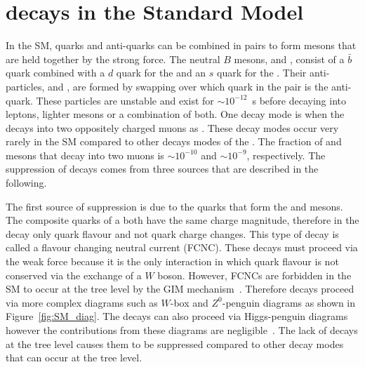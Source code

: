 \section[$B^0_{(s)}\to \mu^+ \mu^-$ decays in the Standard Model]{ decays in the Standard Model}
\label{sec:bsmumu_in_SM}
In the SM, quarks and anti-quarks can be combined in pairs to form mesons that are held together by the strong force. The neutral $B$ mesons, \bd and \bs, consist of a $\bar{b}$ quark combined with a $d$ quark for the \bd and an $s$ quark for the \bs. Their anti-particles, \barbd and \barbs, are formed by swapping over which quark in the pair is the anti-quark. These particles are unstable and exist for $\sim10^{-12}$~s before decaying into leptons, lighter mesons or a combination of both. One decay mode is when the \bsd decays into two oppositely charged muons as \bmumu. %
These decay modes occur very rarely in the SM compared to other decays modes of the \bsd. The fraction of \bd and \bs mesons that decay into two muons is $\sim10^{-10}$ and $\sim10^{-9}$, respectively. The suppression of \bmumu decays comes from three sources that are described in the following.


The first source of suppression is due to the quarks that form the \bd and \bs mesons. The composite quarks of a \bsd both have the same charge magnitude, therefore in the decay \bmumu only quark flavour and not quark charge changes. This type of decay is called a flavour changing neutral current (FCNC). These decays must proceed via the weak force because it is the only interaction in which quark flavour is not conserved via the exchange of a $W$ boson. However, FCNCs are forbidden in the SM to occur at the tree level by the GIM mechanism~\cite{PhysRevD.2.1285}. Therefore \bmumu decays proceed via more complex diagrams such as $W$-box and $Z^0$-penguin diagrams as shown in Figure~\ref{fig:SM_diag}.
The decays can also proceed via Higgs-penguin diagrams however the contributions from these diagrams are negligible~\cite{Arbey:2012ax}. %
The lack of \bmumu decays at the tree level causes them to be suppressed compared to other \bsd decay modes that can occur at the tree level.

